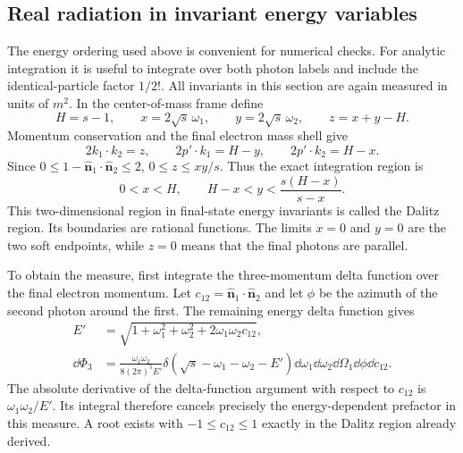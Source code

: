 \subsection{Real radiation in invariant energy variables}
\label{sec:comp-supp-real-invariants}
The energy ordering used above is convenient for numerical checks.
For analytic integration it is useful to integrate over both photon
labels and include the identical-particle factor $1/2!$.
All invariants in this section are again measured in units of $m^2$.
In the center-of-mass frame define
\begin{equation}
 H=s-1,\qquad x=2\sqrt{s}\,\omega_1,\qquad
 y=2\sqrt{s}\,\omega_2,\qquad z=x+y-H.
\end{equation}
Momentum conservation and the final electron mass shell give
\begin{equation}
 2k_1\cdot k_2=z,\qquad
 2p'\cdot k_1=H-y,\qquad 2p'\cdot k_2=H-x.
\end{equation}
Since $0\leq1-\widehat{\bm n}_1\cdot\widehat{\bm n}_2\leq2$,
$0\leq z\leq xy/s$. Thus the exact integration region is
\begin{equation}
 0<x<H,\qquad H-x<y<\frac{s(H-x)}{s-x}.
 \label{eq:comp-real-dalitz-region}
\end{equation}
This two-dimensional region in final-state energy invariants is
called the Dalitz region. Its boundaries are rational functions. The limits $x=0$ and $y=0$
are the two soft endpoints, while $z=0$ means that the final photons
are parallel.

To obtain the measure, first integrate the three-momentum delta
function over the final electron momentum. Let
$c_{12}=\widehat{\bm n}_1\cdot\widehat{\bm n}_2$ and let $\phi$
be the azimuth of the second photon around the first. The remaining
energy delta function gives
\begin{align}
 E'&=\sqrt{1+\omega_1^2+\omega_2^2+2\omega_1\omega_2c_{12}},\\
 \dd\Phi_3&=\frac{\omega_1\omega_2}{8(2\pi)^5 E'}
 \delta(\sqrt{s}-\omega_1-\omega_2-E')
 \dd\omega_1\dd\omega_2\dd\Omega_1\dd\phi\dd c_{12}.
\end{align}
The absolute derivative of the delta-function argument with respect
to $c_{12}$ is $\omega_1\omega_2/E'$. Its integral therefore
cancels precisely the energy-dependent prefactor in this measure.
A root exists with $-1\leq c_{12}\leq1$ exactly in the Dalitz region
already derived.

